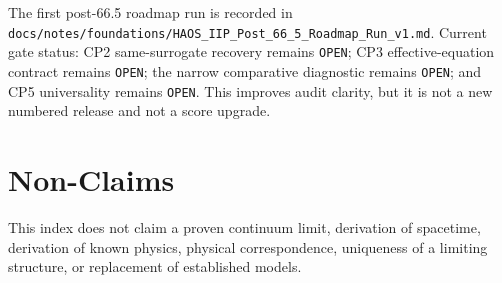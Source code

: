 \documentclass[10pt]{article}
\begin{document}
The first post-66.5 roadmap run is recorded in \texttt{docs/notes/foundations/HAOS\_IIP\_Post\_66\_5\_Roadmap\_Run\_v1.md}. Current gate status: CP2 same-surrogate recovery remains \texttt{OPEN}; CP3 effective-equation contract remains \texttt{OPEN}; the narrow comparative diagnostic remains \texttt{OPEN}; and CP5 universality remains \texttt{OPEN}. This improves audit clarity, but it is not a new numbered release and not a score upgrade.

\section*{Non-Claims}

This index does not claim a proven continuum limit, derivation of spacetime, derivation of known physics, physical correspondence, uniqueness of a limiting structure, or replacement of established models.

\begin{center}
\end{center}
\end{document}
